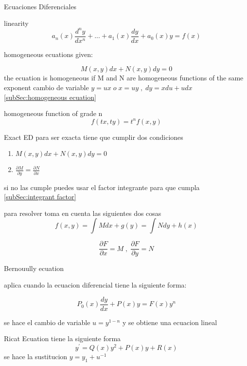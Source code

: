 \begin{section}{Ecuaciones Diferenciales}
	\begin{subsection}{linearity}
		$$ a_n(x) \frac{d^ny}{dx^n} + ... +  a_1(x) \frac{dy}{dx} + a_0(x)y = f(x)$$ 
	\end{subsection}
	\newpage
	\begin{subsection}{homogeneous ecuations}
		given:

		 $$M(x,y)dx + N(x,y)dy = 0$$
		 the ecuation is homogeneous if M and N are homogeneous functions of the same exponent
		cambio de variable $y=ux \; o \; x=uy \; , \; dy=xdu + udx $
		\autoref{subSec:homogeneous ecuation}{}
	\end{subsection}
	\begin{subsection}{homogeneous function of grade n}
		$$f(tx,ty) = t^nf(x,y)$$
		\label{subSec:homogeneous ecuation}
	\end{subsection}
	\begin{subsection}{Exact ED}
		para ser exacta tiene que cumplir dos condiciones 
	\begin{enumerate}
		\item $M(x,y)dx + N(x,y)dy = 0$
		\item $\frac{\partial M}{\partial y} = \frac{\partial N }{\partial x}$
	\end{enumerate}
	si no las cumple puedes usar el factor integrante para que cumpla
		\label{subSec:Exact ED}
		\autoref{subSec:integrant factor}{}


		para resolver toma en cuenta las siguientes dos cosas
		$$f(x,y) = \int M dx + g(y) = \int N dy + h(x) $$
	
	
		$$ \frac{ \partial F}{ \partial x} = M \; , \; \frac{ \partial F }{ \partial y} = N $$
	\end{subsection}
	\begin{subsection}{Bernouully ecuation}
	
		aplica cuando la ecuacion diferencial tiene la siguiente forma:
		
		$$P_0(x)\frac{dy}{dx} + P(x)y = F(x)y^n$$
		
		se hace el cambio de variable $u = y^{1-n}$ y se obtiene una ecuacion lineal
	
	
	\end{subsection}
	\begin{subsection}{Ricat Ecuation}
		 tiene la siguiente forma
		  $$y^{'} = Q(x)y^{2} + P(x)y + R(x)$$
		se hace la sustitucion $y=y_1 + u^{-1}$ 
	
	\end{subsection}


\end{section}
